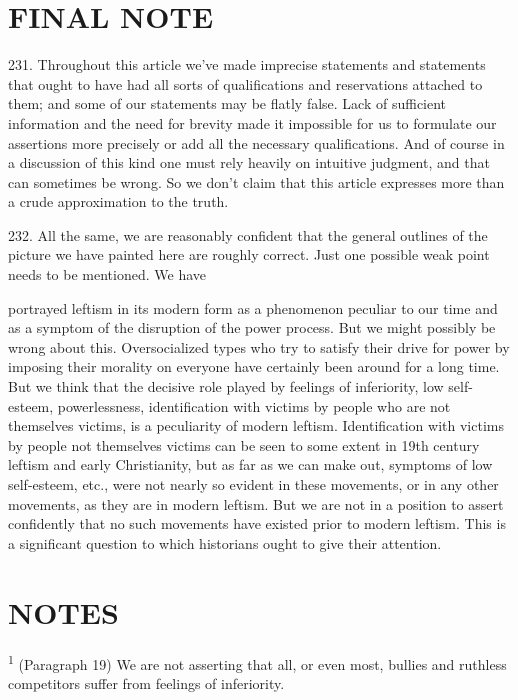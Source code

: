 \documentclass{article}
\begin{document}
\section{FINAL NOTE}

\hspace{0.5cm} 231. Throughout this article we’ve made imprecise statements and statements that ought to have 
had all sorts of qualifications and reservations attached to them; and some of our statements may 
be flatly false. Lack of sufficient information and the need for brevity made it impossible for us 
to formulate our assertions more precisely or add all the necessary qualifications. And of course 
in a discussion of this kind one must rely heavily on intuitive judgment, and that can sometimes 
be wrong. So we don’t claim that this article expresses more than a crude approximation to the 
truth. \vspace{\baselineskip} 

232. All the same, we are reasonably confident that the general outlines of the picture we have 
painted here are roughly correct. Just one possible weak point needs to be mentioned. We have 

portrayed leftism in its modern form as a phenomenon peculiar to our time and as a symptom of 
the disruption of the power process. But we might possibly be wrong about this. Oversocialized 
types who try to satisfy their drive for power by imposing their morality on everyone have certainly 
been around for a long time. But we think that the decisive role played by feelings of inferiority, 
low self-esteem, powerlessness, identification with victims by people who are not themselves
victims, is a peculiarity of modern leftism. Identification with victims by people not themselves 
victims can be seen to some extent in 19th century leftism and early Christianity, but as far as we 
can make out, symptoms of low self-esteem, etc., were not nearly so evident in these movements, 
or in any other movements, as they are in modern leftism. But we are not in a position to assert 
confidently that no such movements have existed prior to modern leftism. This is a significant 
question to which historians ought to give their attention. 

\afterpage{\null\newpage}
\newpage

\section{NOTES}

\hspace{0.5cm} \textsuperscript{1} (Paragraph 19) We are not asserting that all, or even most, bullies and ruthless competitors 
suffer from feelings of inferiority. \vspace{\baselineskip} 
\end{document}
